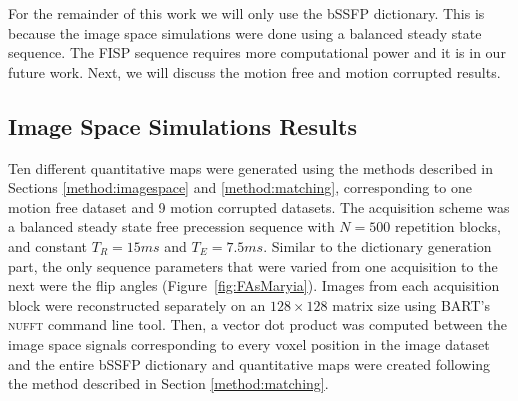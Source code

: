 \hfill

For the remainder of this work we will only use the bSSFP dictionary.
This is because the image space simulations were done using a balanced steady state sequence.
The FISP sequence requires more computational power and it is in our future work.
Next, we will discuss the motion free and motion corrupted results.

\clearpage
\subsection{Image Space Simulations Results}

Ten different quantitative maps were generated using the methods described in Sections \ref{method:imagespace} and \ref{method:matching}, corresponding to one motion free dataset and 9 motion corrupted datasets.
The acquisition scheme was a balanced steady state free precession sequence with $N = 500$ repetition blocks, and constant $T_R = 15ms$ and $T_E = 7.5ms$.
Similar to the dictionary generation part, the only sequence parameters that were varied from one acquisition to the next were the flip angles (Figure~\ref{fig:FAsMaryia}).
Images from each acquisition block were reconstructed separately on an $128 \times 128$ matrix size using BART's \textsc{nufft} command line tool.
Then, a vector dot product was computed between the image space signals corresponding to every voxel position in the image dataset and the entire bSSFP dictionary and quantitative maps were created following the method described in Section \ref{method:matching}.

